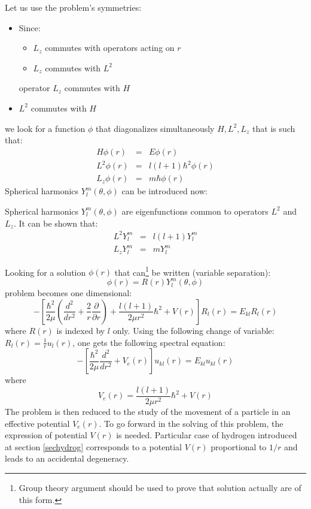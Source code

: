 \documentclass[12pt]{book}
\begin{document}
Let us use the problem's symmetries:
\begin{itemize}
\item Since:
      \begin{itemize}
       \item $L_z$ commutes with operators acting on $r$
       \item $L_z$ commutes with $L^2$
      \end{itemize}
operator $L_z$ commutes with $H$
\item $L^2$ commutes with $H$
\end{itemize}
we look for a function $\phi$ that diagonalizes simultaneously
$H,L^2,L_z$ that is such that: 
\begin{eqnarray}
H\phi(r)&=&E\phi(r)\\
L^2\phi(r)&=&l(l+1)\hbar^2\phi(r)\\
L_z\phi(r)&=&m\hbar\phi(r)
\end{eqnarray}
Spherical harmonics $Y^m_l(\theta,\phi)$ can be introduced now:
\begin{defn}
Spherical harmonics  $Y^m_l(\theta,\phi)$ are eigenfunctions common to
operators $L^2$ and $L_z$. It can be shown that:
\begin{eqnarray}
L^2Y^m_l&=&l(l+1)Y^m_l\\
L_zY^m_l&=&mY^m_l
\end{eqnarray}
\end{defn}
Looking for a solution $\phi(r)$ that can\footnote{Group theory
argument should be used to prove that solution actually are of this
form.}%
 be written (variable separation): 
\begin{equation}
\phi(r)=R(r)Y^m_l(\theta,\phi)
\end{equation}
problem becomes one dimensional:
\begin{equation}\label{eqaonedimrr}
-[\frac{\hbar^2}{2\mu}(\frac{d^2}{dr^2}+\frac{2}{r}\frac{\partial}{\partial
r})+\frac{l(l+1)}{2\mu r^2}\hbar^2+V(r)]R_{l}(r)=E_{kl}R_{l}(r)
\end{equation}
where  $R(r)$ is indexed by $l$ only.
Using the following change of variable:
$R_{l}(r)=\frac{1}{r}u_{l}(r)$, one gets the following spectral equation:
\begin{equation}
-[\frac{\hbar^2}{2\mu}\frac{d^2}{dr^2}+V_e(r)]u_{kl}(r)=E_{kl}u_{kl}(r)
\end{equation}
where
\begin{equation}
V_e(r)=\frac{l(l+1)}{2\mu r^2}\hbar^2+V(r)
\end{equation}
The problem is then reduced to the study of
the movement of a particle in an effective potential $V_e(r)$. To go
forward in the solving of this problem, the expression of
potential $V(r)$ is 
needed.  Particular case of hydrogen introduced at section
\ref{sechydrog} corresponds to a potential $V(r)$ proportional to
$1/r$ and leads to an accidental degeneracy.
\end{document}

